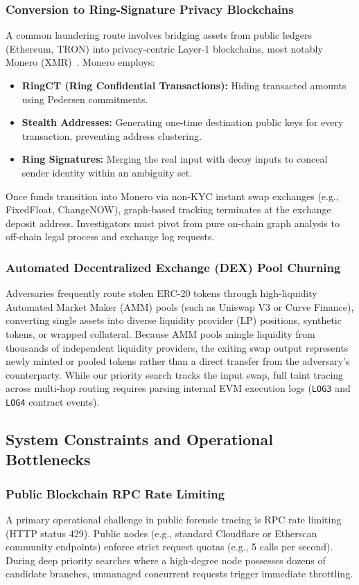 \subsubsection{Conversion to Ring-Signature Privacy Blockchains}
A common laundering route involves bridging assets from public ledgers (Ethereum, TRON) into privacy-centric Layer-1 blockchains, most notably Monero (XMR)~\cite{moser2018anonymous}. Monero employs:
\begin{itemize}
    \item \textbf{RingCT (Ring Confidential Transactions):} Hiding transacted amounts using Pedersen commitments.
    \item \textbf{Stealth Addresses:} Generating one-time destination public keys for every transaction, preventing address clustering.
    \item \textbf{Ring Signatures:} Merging the real input with decoy inputs to conceal sender identity within an ambiguity set.
\end{itemize}
Once funds transition into Monero via non-KYC instant swap exchanges (e.g., FixedFloat, ChangeNOW), graph-based tracking terminates at the exchange deposit address. Investigators must pivot from pure on-chain graph analysis to off-chain legal process and exchange log requests.

\subsubsection{Automated Decentralized Exchange (DEX) Pool Churning}
Adversaries frequently route stolen ERC-20 tokens through high-liquidity Automated Market Maker (AMM) pools (such as Uniswap V3 or Curve Finance), converting single assets into diverse liquidity provider (LP) positions, synthetic tokens, or wrapped collateral. Because AMM pools mingle liquidity from thousands of independent liquidity providers, the exiting swap output represents newly minted or pooled tokens rather than a direct transfer from the adversary's counterparty. While our priority search tracks the input swap, full taint tracing across multi-hop routing requires parsing internal EVM execution logs (\texttt{LOG3} and \texttt{LOG4} contract events).

\subsection{System Constraints and Operational Bottlenecks}

\subsubsection{Public Blockchain RPC Rate Limiting}
A primary operational challenge in public forensic tracing is RPC rate limiting (HTTP status 429). Public nodes (e.g., standard Cloudflare or Etherscan community endpoints) enforce strict request quotas (e.g., 5 calls per second). During deep priority searches where a high-degree node possesses dozens of candidate branches, unmanaged concurrent requests trigger immediate throttling.

